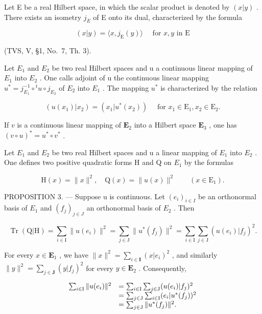 
Let E be a real Hilbert space, in which the scalar product is denoted by \((x|y)\) . There exists an isometry \(j_{E}\) of E onto its dual, characterized by the formula

\[
(x | y) = \langle x, j _ {\mathrm{E}} (y) \rangle \quad \text { for } x, y \text { in } \mathrm{E}\tag{3}
\]

(TVS, V, §1, No.~7, Th. 3).

Let \(E_{1}\) and \(E_{2}\) be two real Hilbert spaces and u a continuous linear mapping of \(E_{1}\) into \(E_{2}\) . One calls adjoint of u the continuous linear mapping \(u^{*} = j_{E_{1}}^{-1} \circ {}^{t}u \circ j_{E_{2}}\) of \(E_{2}\) into \(E_{1}\) . The mapping \(u^{*}\) is characterized by the relation

\[
(u (x _ {1}) | x _ {2}) = (x _ {1} | u ^ {*} (x _ {2})) \quad \text { for } x _ {1} \in \mathrm{E} _ {1}, x _ {2} \in \mathrm{E} _ {2}.\tag{4}
\]

If \(v\) is a continuous linear mapping of \(\mathbf{E}_2\) into a Hilbert space \(\mathbf{E}_3\) , one has \((v \circ u)^* = u^* \circ v^*\) .

Let \(E_{1}\) and \(E_{2}\) be two real Hilbert spaces and u a linear mapping of \(E_{1}\) into \(E_{2}\) . One defines two positive quadratic forms H and Q on \(E_{1}\) by the formulas

\[
\mathrm{H} (x) = \| x \| ^ {2}, \quad \mathrm{Q} (x) = \| u (x) \| ^ {2} \qquad (x \in \mathrm{E} _ {1}).
\]

PROPOSITION 3. --- Suppose u is continuous. Let \((e_{i})_{i\in I}\) be an orthonormal basis of \(E_{1}\) and \((f_{j})_{j\in J}\) an orthonormal basis of \(E_{2}\) . Then

\[
\operatorname{Tr} (\mathrm{Q} | \mathrm{H}) = \sum_ {i \in \mathrm{I}} \| u (e _ {i}) \| ^ {2} = \sum_ {j \in \mathrm{J}} \| u ^ {*} (f _ {j}) \| ^ {2} = \sum_ {i \in \mathrm{I}} \sum_ {j \in \mathrm{J}} (u (e _ {i}) | f _ {j}) ^ {2}.
\]

For every \(x \in \mathbf{E}_1\) , we have \(\|x\|^2 = \sum_{i \in \mathbf{I}} (x|e_i)^2\) , and similarly \(\|y\|^2 = \sum_{j \in \mathbf{J}} (y|f_j)^2\) for every \(y \in \mathbf{E}_2\) . Consequently,

\[
\begin{array}{r l} \sum_ {i \in \mathrm{I}} \| u (e _ {i}) \| ^ {2} & = \sum_ {i \in \mathrm{I}} \sum_ {j \in \mathrm{J}} (u (e _ {i}) | f _ {j}) ^ {2} \\ & = \sum_ {j \in \mathrm{J}} \sum_ {i \in \mathrm{I}} (e _ {i} | u ^ {*} (f _ {j})) ^ {2} \\ & = \sum_ {j \in \mathrm{J}} \| u ^ {*} (f _ {j}) \| ^ {2}. \end{array}
\]

